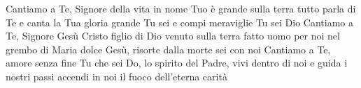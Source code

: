 \beginverse
Cantiamo a Te, Signore della vita
in nome Tuo è grande sulla terra
tutto parla di Te e canta la Tua gloria
grande Tu sei e compi meraviglie Tu sei Dio
Cantiamo a Te, Signore Gesù Cristo
figlio di Dio venuto sulla terra
fatto uomo per noi nel grembo di Maria
dolce Gesù, risorte dalla morte sei con noi
Cantiamo a Te, amore senza fine
Tu che sei Do, lo spirito del Padre,
vivi dentro di noi e guida i nostri passi
accendi in noi il fuoco dell'eterna carità
\endverse
\endsong
